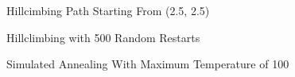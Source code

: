 \documentclass{article}
\begin{document}
  \begin{figure}
    \caption{Hillcimbing Path Starting From (2.5, 2.5)}
  \end{figure}
  \begin{figure}
    \caption{Hillclimbing with 500 Random Restarts}
  \end{figure}
  \begin{figure}
    \caption{Simulated Annealing With Maximum Temperature of 100}
  \end{figure}
\end{document}
